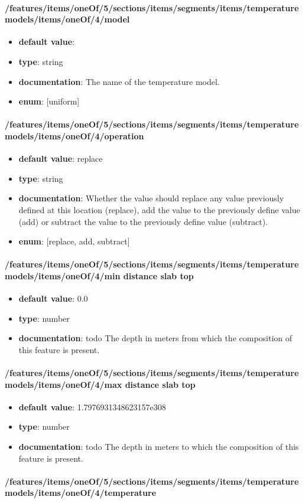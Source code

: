 \paragraph{/features/items/oneOf/5/sections/items/segments/items/temperature models/items/oneOf/4/model}
\begin{itemize}\item {\bf default value}: 
\item {\bf type}: string
\item {\bf documentation}: The name of the temperature model.
\item {\bf enum}: [uniform]\end{itemize}\paragraph{/features/items/oneOf/5/sections/items/segments/items/temperature models/items/oneOf/4/operation}
\begin{itemize}\item {\bf default value}: replace
\item {\bf type}: string
\item {\bf documentation}: Whether the value should replace any value previously defined at this location (replace), add the value to the previously define value (add) or subtract the value to the previously define value (subtract).
\item {\bf enum}: [replace, add, subtract]\end{itemize}\paragraph{/features/items/oneOf/5/sections/items/segments/items/temperature models/items/oneOf/4/min distance slab top}
\begin{itemize}\item {\bf default value}: 0.0
\item {\bf type}: number
\item {\bf documentation}: todo The depth in meters from which the composition of this feature is present.
\end{itemize}\paragraph{/features/items/oneOf/5/sections/items/segments/items/temperature models/items/oneOf/4/max distance slab top}
\begin{itemize}\item {\bf default value}: 1.7976931348623157e308
\item {\bf type}: number
\item {\bf documentation}: todo The depth in meters to which the composition of this feature is present.
\end{itemize}\paragraph{/features/items/oneOf/5/sections/items/segments/items/temperature models/items/oneOf/4/temperature}
